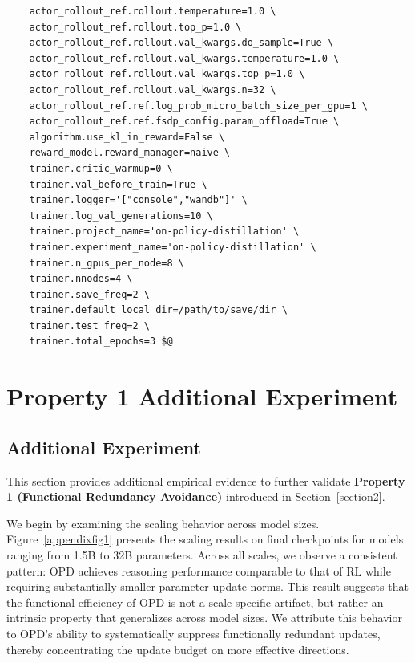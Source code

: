 \documentclass{article}
\begin{document}
\begin{tcolorbox}
\begin{verbatim}
    actor_rollout_ref.rollout.temperature=1.0 \
    actor_rollout_ref.rollout.top_p=1.0 \
    actor_rollout_ref.rollout.val_kwargs.do_sample=True \
    actor_rollout_ref.rollout.val_kwargs.temperature=1.0 \
    actor_rollout_ref.rollout.val_kwargs.top_p=1.0 \
    actor_rollout_ref.rollout.val_kwargs.n=32 \
    actor_rollout_ref.ref.log_prob_micro_batch_size_per_gpu=1 \
    actor_rollout_ref.ref.fsdp_config.param_offload=True \
    algorithm.use_kl_in_reward=False \
    reward_model.reward_manager=naive \
    trainer.critic_warmup=0 \
    trainer.val_before_train=True \
    trainer.logger='["console","wandb"]' \
    trainer.log_val_generations=10 \
    trainer.project_name='on-policy-distillation' \
    trainer.experiment_name='on-policy-distillation' \
    trainer.n_gpus_per_node=8 \
    trainer.nnodes=4 \
    trainer.save_freq=2 \
    trainer.default_local_dir=/path/to/save/dir \
    trainer.test_freq=2 \
    trainer.total_epochs=3 $@
\end{verbatim}
\end{tcolorbox}

    



\newpage


\section{Property 1 Additional Experiment}
\label{Property 1 Additional Experiment}

\subsection{Additional Experiment}
\label{Additional Experiment}
This section provides additional empirical evidence to further validate \textbf{Property 1 (Functional Redundancy Avoidance)} introduced in Section~\ref{section2}. 

We begin by examining the scaling behavior across model sizes. Figure~\ref{appendixfig1} presents the scaling results on final checkpoints for models ranging from 1.5B to 32B parameters. Across all scales, we observe a consistent pattern: OPD achieves reasoning performance comparable to that of RL while requiring substantially smaller parameter update norms. This result suggests that the functional efficiency of OPD is not a scale-specific artifact, but rather an intrinsic property that generalizes across model sizes. We attribute this behavior to OPD's ability to systematically suppress functionally redundant updates, thereby concentrating the update budget on more effective directions.
\end{document}
